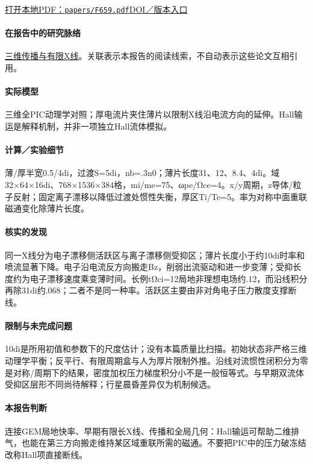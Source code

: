 \href{run:papers/F659.pdf}{打开本地PDF：\texttt{papers/F659.pdf}}\quad\href{https://doi.org/10.1029/2019ja026539}{DOI／版本入口}

\paragraph{在报告中的研究脉络}\hyperref[story:three]{三维传播与有限X线}。关联表示本报告的阅读线索，不自动表示这些论文互相引用。

\paragraph{实际模型}三维全PIC动理学对照；厚电流片夹住薄片以限制X线沿电流方向的延伸。Hall输运是解释机制，并非一项独立Hall流体模拟。

\paragraph{计算／实验细节}薄/厚半宽0.5/4di，过渡S=5di，nb=.3n0；薄片长度31、12、8.4、4di。域32×64×16di、768×1536×384格，mi/me=75、ωpe/Ωce=4。x/y周期，z导体/粒子反射；固定离子漂移以降低过渡处惯性失衡，厚区Ti/Te=5。率为对称中面重联磁通变化除薄片长度。

\paragraph{核实的发现}同一X线分为电子漂移侧活跃区与离子漂移侧受抑区；薄片长度小于约10di时率和喷流显著下降。电子沿电流反方向搬走Bz，削弱出流驱动和进一步变薄；受抑长度约为电子漂移速度乘变薄时间。长例tΩci=12局地非理想电场约.12，而沿线积分再除31di约.068；二者不是同一种率。活跃区主要由非对角电子压力散度支撑断线。

\paragraph{限制与未完成问题}10di是所用初值和参数下的尺度估计；没有本篇质量比扫描。初始状态非严格三维动理学平衡；反平行、有限周期盒与人为厚片限制外推。沿线对流惯性闭积分为零是对称/周期下的结果，密度加权压力梯度积分小不是一般恒等式。与早期双流体受抑区层形不同尚待解释；行星晨昏差异仅为机制候选。

\paragraph{本报告判断}连接GEM局地快率、早期有限长X线、传播和全局几何：Hall输运可帮助二维排气，也能在第三方向搬走维持某区域重联所需的磁通。不要把PIC中的压力破冻结改称Hall项直接断线。

